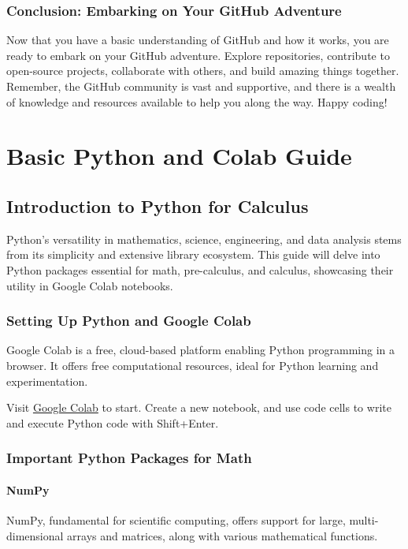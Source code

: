 \documentclass[a4paper,12pt]{book}
\begin{document}
\subsection*{Conclusion: Embarking on Your GitHub Adventure}

Now that you have a basic understanding of GitHub and how it works, you are ready to embark on your GitHub adventure. Explore repositories, contribute to open-source projects, collaborate with others, and build amazing things together. Remember, the GitHub community is vast and supportive, and there is a wealth of knowledge and resources available to help you along the way. Happy coding!

\chapter{Basic Python and Colab Guide}
\section*{Introduction to Python for Calculus}

Python's versatility in mathematics, science, engineering, and data analysis stems from its simplicity and extensive library ecosystem. This guide will delve into Python packages essential for math, pre-calculus, and calculus, showcasing their utility in Google Colab notebooks.

\subsection*{Setting Up Python and Google Colab}

Google Colab is a free, cloud-based platform enabling Python programming in a browser. It offers free computational resources, ideal for Python learning and experimentation.

Visit \href{https://colab.research.google.com/}{Google Colab} to start. Create a new notebook, and use code cells to write and execute Python code with Shift+Enter.

\subsection*{Important Python Packages for Math}

\subsubsection*{NumPy}
NumPy, fundamental for scientific computing, offers support for large, multi-dimensional arrays and matrices, along with various mathematical functions.
\end{document}
